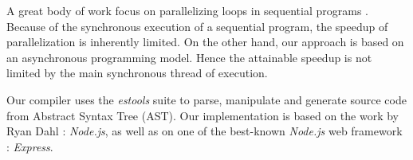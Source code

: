 A great body of work focus on parallelizing loops in sequential programs \cite{Banerjee2013}. %
Because of the synchronous execution of a sequential program, the speedup of parallelization is inherently limited.
On the other hand, our approach is based on an asynchronous programming model.
Hence the attainable speedup is not limited by the main synchronous thread of execution.



Our compiler uses the \textit{estools} suite to parse, manipulate and generate source code from Abstract Syntax Tree (AST).
Our implementation is based on the work by Ryan Dahl : \textit{Node.js}, as well as on one of the best-known \textit{Node.js} web framework : \textit{Express}.